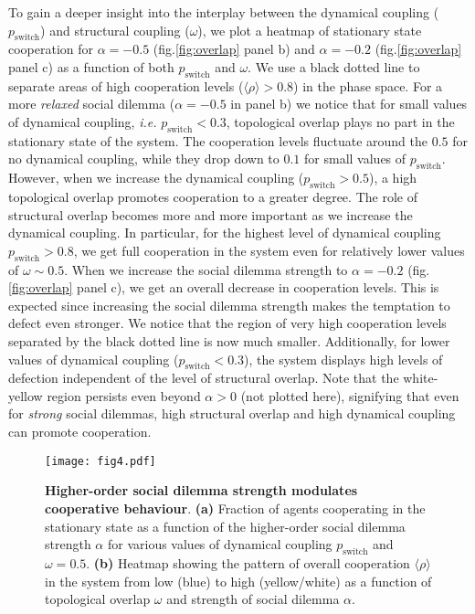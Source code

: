 \documentclass[a4paper,pre,reqno,superscriptaddress,twocolumn, floatfix]{revtex4}
\begin{document}
To gain a deeper insight into the interplay between the dynamical coupling ($p_{\text{switch}}$) and structural coupling ($\omega$), we plot a heatmap of stationary state cooperation for $\alpha=-0.5$ (fig.\eqref{fig:overlap} panel b) and $\alpha=-0.2$ (fig.\eqref{fig:overlap} panel c) as a function of both $p_{\text{switch}}$ and $\omega$. We use a black dotted line to separate areas of high cooperation levels ($\langle \rho \rangle > 0.8$) in the phase space. For a more \textit{relaxed} social dilemma ($\alpha = -0.5$ in panel b) we notice that for small values of dynamical coupling, \textit{i.e.} $p_{\text{switch}}<0.3$, topological overlap plays no part in the stationary state of the system. The cooperation levels fluctuate around the $0.5$ for no dynamical coupling, while they drop down to $0.1$ for small values of $p_{\text{switch}}$. However, when we increase the dynamical coupling ($p_{\text{switch}}>0.5$), a high topological overlap promotes cooperation to a greater degree. The role of structural overlap becomes more and more important as we increase the dynamical coupling. In particular, for the highest level of dynamical coupling $p_{\text{switch}}>0.8$, we get full cooperation in the system even for relatively lower values of $\omega \sim 0.5$. When we increase the social dilemma strength to $\alpha = -0.2$ (fig.\eqref{fig:overlap} panel c), we get an overall decrease in cooperation levels. This is expected since increasing the social dilemma strength makes the temptation to defect even stronger. We notice that the region of very high cooperation levels separated by the black dotted line is now much smaller. Additionally, for lower values of dynamical coupling ($p_{\text{switch}}<0.3$), the system displays high levels of defection independent of the level of structural overlap. Note that the white-yellow region persists even beyond $\alpha>0$ (not plotted here), signifying that even for \textit{strong} social dilemmas, high structural overlap and high dynamical coupling can promote cooperation.









\begin{figure*}[!ht]
    \centering
    \texttt{[image: fig4.pdf]}
    \caption{\textbf{Higher-order social dilemma strength modulates cooperative behaviour}. \textbf{(a)} Fraction of agents cooperating in the stationary state as a function of the higher-order social dilemma strength $\alpha$ for various values of dynamical coupling $p_{\text{switch}}$ and $\omega=0.5$. \textbf{(b)} Heatmap showing the pattern of overall cooperation $\langle \rho \rangle$ in the system from low (blue) to high (yellow/white) as a function of topological overlap $\omega$ and strength of social dilemma $\alpha$.}
    \label{fig:dilemma_strength}
\end{figure*}
\end{document}
